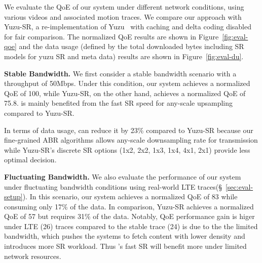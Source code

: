\label{sec:eval-qoe}

We evaluate the QoE of our system under different network conditions, using various videos and associated motion traces. We compare our approach with Yuzu-SR, a re-implementation of Yuzu~\cite{zhang_yuzu_nodate} with caching and delta coding disabled for fair comparison. The normalized QoE results are shown in Figure~\ref{fig:eval-qoe} and the data usage (defined by the total downloaded bytes including SR models for yuzu SR and meta data) results are shown in Figure~\ref{fig:eval-du}.

\textbf{Stable Bandwidth.} We first consider a stable bandwidth scenario with a throughput of 50Mbps. Under this condition, our system achieves a normalized QoE of 100, while Yuzu-SR, on the other hand, achieves a normalized QoE of 75.8. \name is mainly benefited from the fast SR speed for any-scale upsampling compared to Yuzu-SR. 

In terms of data usage, \name can reduce it by 23\% compared to Yuzu-SR because our fine-grained ABR algorithms allows any-scale downsampling rate for transmission while Yuzu-SR's discrete SR options (1x2, 2x2, 1x3, 1x4, 4x1, 2x1) provide less optimal decision.

\textbf{Fluctuating Bandwidth.} We also evaluate the performance of our system under fluctuating bandwidth conditions using real-world LTE traces(\S~\ref{sec:eval-setup}). In this scenario, our system achieves a normalized QoE of 83 while consuming only 17\% of the data. In comparison, Yuzu-SR achieves a normalized QoE of 57 but requires 31\% of the data. Notably, QoE performance gain is higer under LTE (26) traces compared to the stable trace (24) is due to the the limited bandwidth, which pushes the systems to fetch content with lower density and introduces more SR workload. Thus \name's fast SR will benefit more under limited network resources.



